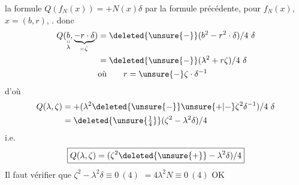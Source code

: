   la formule $Q(f_N(x))=+N(x)\delta$ par la formule précédente, pour $f_N(x)$, $x=(b,r)$, .
 donc
\[
\begin{aligned}Q(\underset{\substack{\shortparallel\\\lambda}}{b},\underbrace{-r\cdot\delta}_{\shortparallel\,\zeta})&=\deleted{\unsure{-}}(b^2-r^2\cdot\delta)/4\ \delta\\ &=\deleted{\unsure{-}}(\lambda^2+r\zeta)/4\ \delta\\ &\text{où}\qquad r=\unsure{-}\zeta\cdot\delta^{-1}\end{aligned}
\]
d'où
\[
\begin{aligned}Q(\lambda,\zeta)&=+(\lambda^2\deleted{\unsure{-}}\unsure{+|-}\zeta^2\delta^{-1})/4\ \delta\\ &=\deleted{\unsure{\tfrac14}}(\zeta^2-\lambda^2\delta)/4\end{aligned}
\]
i.e.
\[
\boxed{Q(\lambda,\zeta)=(\zeta^2\deleted{\unsure{+}}-\lambda^2\delta)/4}
\]
Il faut vérifier que $\zeta^2-\lambda^2\delta\equiv0\ (4)$
$=4\lambda^2N\equiv0\ (4)$ OK 
